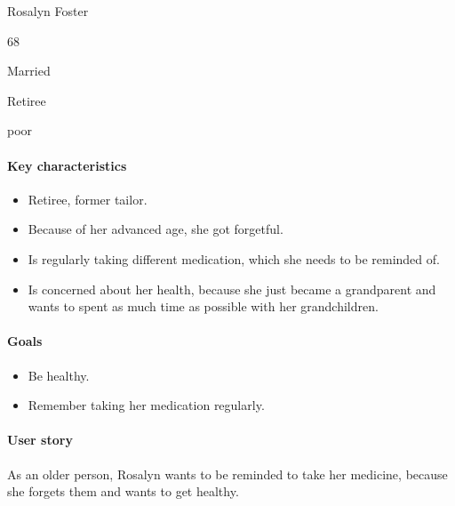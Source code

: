 \documentclass[conference]{IEEEtran}
\begin{document}
\begin{description}[labelwidth=\widthof{\bfseries Computer skills},leftmargin=.8cm,labelindent=.8cm]
	\item[Name] Rosalyn Foster
	\item[Age] 68
	\item[Marital status] Married
	\item[Occupation] Retiree
	\item[Computer skills] poor
\end{description}

\paragraph*{Key characteristics}
\begin{itemize}[leftmargin=1.25cm]
	\item Retiree, former tailor.
	\item Because of her advanced age, she got forgetful.
	\item Is regularly taking different medication, which she needs to be reminded of.
	\item Is concerned about her health, because she just became a grandparent and wants to spent as much time as possible with her grandchildren.
\end{itemize}

\paragraph*{Goals}
\begin{itemize}[leftmargin=1.25cm]
	\item Be healthy.
	\item Remember taking her medication regularly.
\end{itemize}

\paragraph*{User story}
As an older person, Rosalyn wants to be reminded to take her medicine, because she forgets them and wants to get healthy.
\end{document}
